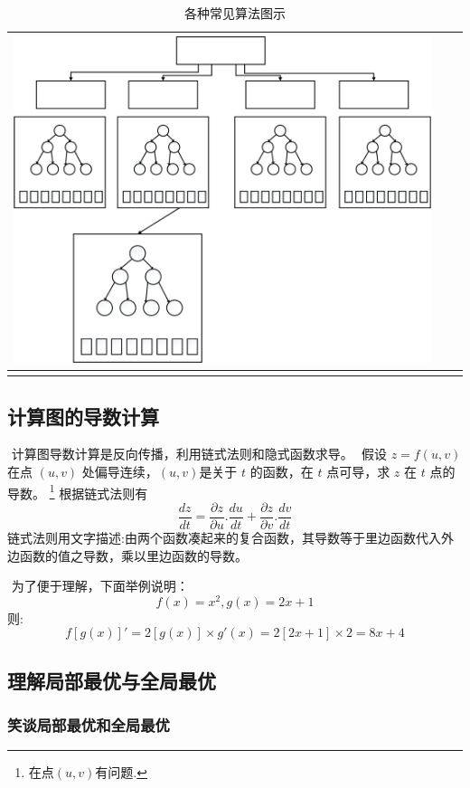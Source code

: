 \begin{longtable}[]{ccc}
\begin{minipage}{1.0\linewidth}
\includegraphics[width=1.0\linewidth]{./img/ch2/2-2-12.png}  
\end{minipage}
\tabularnewline
\bottomrule
\caption{各种常见算法图示}
\end{longtable}

\subsection{计算图的导数计算}
\label{ux8ba1ux7b97ux56feux7684ux5bfcux6570ux8ba1ux7b97}
​ 计算图导数计算是反向传播，利用链式法则和隐式函数求导。
​ 假设 $z = f(u,v)$ 在点 $(u,v)$ 处偏导连续，$(u,v)$是关于 $t$
的函数，在 $t$ 点可导，求 $z$ 在 $t$ 点的导数。
\footnote{在点$(u,v)$有问题.}
根据链式法则有
\[
  \frac{dz}{dt}=\frac{\partial z}{\partial u}.\frac{du}{dt}+
  \frac{\partial z}{\partial v}.\frac{dv}{dt}
\] ​
链式法则用文字描述:由两个函数凑起来的复合函数，其导数等于里边函数代入外边函数的值之导数，乘以里边函数的导数。

​ 为了便于理解，下面举例说明：
\[
f(x)=x^2,g(x)=2x+1
\]
则:
\[
{f[g(x)]}'=2[g(x)] \times g'(x)=2[2x+1] \times 2=8x+4
\]

\subsection{理解局部最优与全局最优}\label{ux7406ux89e3ux5c40ux90e8ux6700ux4f18ux4e0eux5168ux5c40ux6700ux4f18}
\subsubsection{笑谈局部最优和全局最优}
\label{sec:1.5.1}


